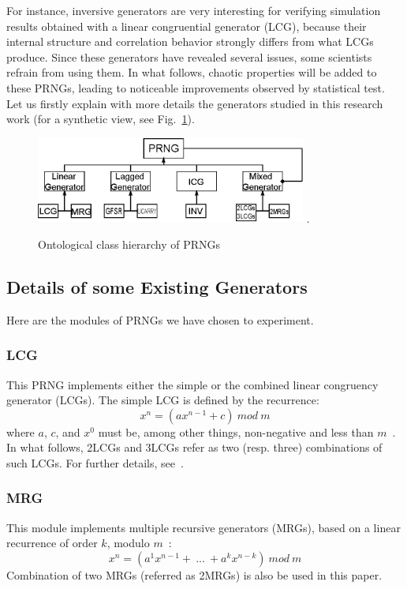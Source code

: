 For instance, inversive generators are very interesting for verifying simulation results obtained with a linear congruential generator (LCG),
because their internal structure and correlation behavior strongly differs from what LCGs produce.
Since these generators have revealed several issues, some scientists refrain from using them.
In what follows, chaotic properties will be added to these PRNGs, leading to noticeable improvements observed by statistical test.
Let us firstly explain with more details the generators studied in this research work (for a synthetic view, see Fig.~\ref{Ontological class hierarchy of RNGs}).

\begin{figure}
\centering
\includegraphics[width=3.5in]{TYPEPRNG.eps}
\DeclareGraphicsExtensions.
\caption{Ontological class hierarchy of PRNGs}
\label{Ontological class hierarchy of RNGs}
\end{figure}

\subsection{Details of some Existing Generators}

Here are the modules of PRNGs we have chosen to experiment.

\subsubsection{LCG}
This PRNG implements either the simple or the combined linear congruency generator (LCGs). The simple LCG is defined by the recurrence:
\begin{equation}
x^n = (ax^{n-1} + c)~mod~m
\label{LCG}
\end{equation}
where $a$, $c$, and $x^0$ must be, among other things, non-negative and less than $m$~\cite{Lecuyer2009}. In what follows, 2LCGs and 3LCGs refer as two (resp. three) combinations of such LCGs.
For further details, see~\cite{combined_lcg}.

\subsubsection{MRG}
This module implements multiple recursive generators (MRGs), based on a linear recurrence of order $k$, modulo $m$~\cite{Lecuyer2009}:
\begin{equation}
x^n = (a^1x^{n-1}+~...~+a^kx^{n-k})~mod~m
\label{MRG}
\end{equation}
Combination of two MRGs (referred as 2MRGs) is also be used in this paper.

